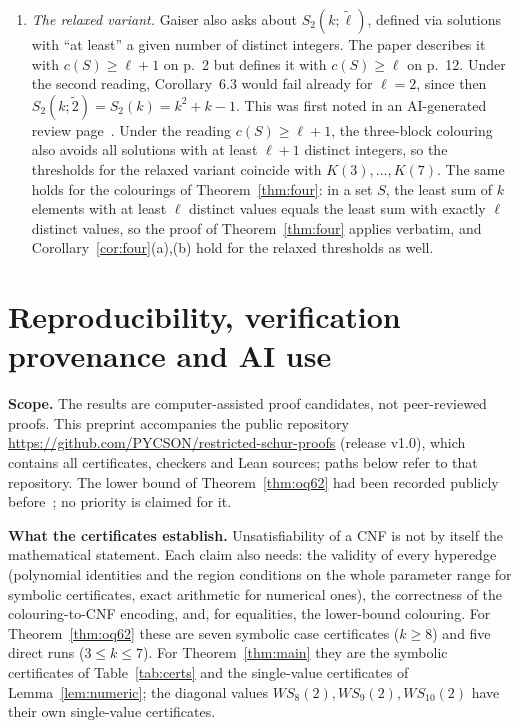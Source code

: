 \documentclass[11pt]{amsart}
\theoremstyle{definition}
\newcommand{\Stwo}{S_2}
\begin{document}
\begin{enumerate}[label=\arabic*.]
\item \emph{The relaxed variant.} Gaiser also asks about $\Stwo(k;\tilde\ell)$, defined via solutions with ``at least'' a given number of distinct integers. The paper describes it with $c(S)\ge\ell+1$ on p.~2 but defines it with $c(S)\ge\ell$ on p.~12. Under the second reading, Corollary~6.3 would fail already for $\ell=2$, since then $\Stwo(k;\tilde2)=S_2(k)=k^2+k-1$. This was first noted in an AI-generated review page~\cite{pith}. Under the reading $c(S)\ge\ell+1$, the three-block colouring also avoids all solutions with at least $\ell+1$ distinct integers, so the thresholds for the relaxed variant coincide with $K(3),\dots,K(7)$. The same holds for the colourings of Theorem~\ref{thm:four}: in a set $S$, the least sum of $k$ elements with at least $\ell$ distinct values equals the least sum with exactly $\ell$ distinct values, so the proof of Theorem~\ref{thm:four} applies verbatim, and Corollary~\ref{cor:four}(a),(b) hold for the relaxed thresholds as well.
\end{enumerate}

\appendix
\section{Reproducibility, verification provenance and AI use}\label{app:repro-ai}



\smallskip\noindent\textbf{Scope.} The results are computer-assisted proof candidates, not peer-reviewed proofs. This preprint accompanies the public repository \url{https://github.com/PYCSON/restricted-schur-proofs} (release v1.0), which contains all certificates, checkers and Lean sources; paths below refer to that repository. The lower bound of Theorem~\ref{thm:oq62} had been recorded publicly before~\cite{omega}; no priority is claimed for it.


\smallskip\noindent\textbf{What the certificates establish.} Unsatisfiability of a CNF is not by itself the mathematical statement. Each claim also needs: the validity of every hyperedge (polynomial identities and the region conditions on the whole parameter range for symbolic certificates, exact arithmetic for numerical ones), the correctness of the colouring-to-CNF encoding, and, for equalities, the lower-bound colouring. For Theorem~\ref{thm:oq62} these are seven symbolic case certificates ($k\ge8$) and five direct runs ($3\le k\le7$). For Theorem~\ref{thm:main} they are the symbolic certificates of Table~\ref{tab:certs} and the single-value certificates of Lemma~\ref{lem:numeric}; the diagonal values $WS_8(2),WS_9(2),WS_{10}(2)$ have their own single-value certificates.
\end{document}
